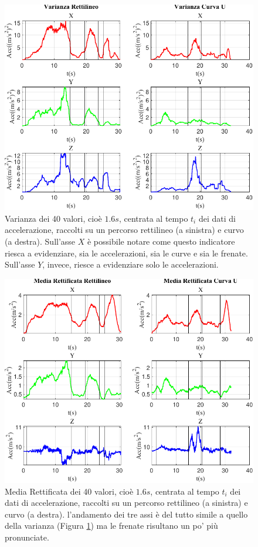 \documentclass[class=article]{standalone}
\begin{document}
	\begin{center}
		\begin{figure}[h!]
			\centering\includegraphics[width=.7\textwidth]{img/LungaCurvaU/Acc/Varianza}
			\caption[]{Varianza dei 40 valori, cioè \(1.6s\), centrata al tempo \(t_{i}\) dei dati di accelerazione, raccolti su un percorso rettilineo (a sinistra) e curvo (a destra). Sull'asse \(X\) è possibile notare come questo indicatore riesca a evidenziare, sia le accelerazioni, sia le curve e sia le frenate. Sull'asse \(Y\), invece, riesce a evidenziare solo le accelerazioni.}
			\label{fig:AccVar_LungaCurvaU}
		\end{figure}
	\end{center}
	
	\begin{center}
		\begin{figure}[h!]
			\centering\includegraphics[width=.7\textwidth]{img/LungaCurvaU/Acc/Media Rettificata}
			\caption[]{Media Rettificata dei 40 valori, cioè \(1.6s\), centrata al tempo \(t_{i}\) dei dati di accelerazione, raccolti su un percorso rettilineo (a sinistra) e curvo (a destra). l'andamento dei tre assi è del tutto simile a quello della varianza (Figura \ref{fig:AccVar_LungaCurvaU}) ma le frenate risultano un po' più pronunciate.}
			\label{fig:AccRett_LungaCurvaU}
		\end{figure}
	\end{center}
	
\end{document}
